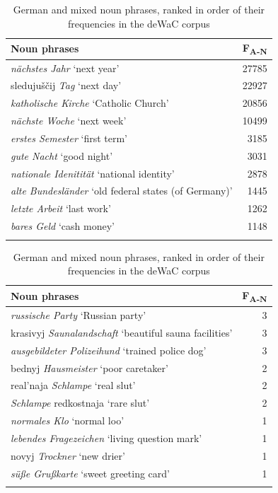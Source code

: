\begin{table}
		\begin{tabular}{lr}
		    \lsptoprule
			Noun phrases	& \multicolumn{1}{c}{F\textsubscript{A-N}} \\ \midrule
			\textit{nächstes Jahr} `next year'	&27785\\
			sledujuščij \textit{Tag} `next day'	&22927\\
			\textit{katholische Kirche} `Catholic Church'	&20856\\
			\textit{nächste Woche}	`next week'	&10499\\
			\textit{erstes Semester} `first term'	&3185\\
			\textit{gute Nacht} `good night'	&3031\\
			\textit{nationale Idenitität} `national identity'	&2878\\
			\textit{alte Bundesländer} `old federal states (of Germany)'	&1445\\
			\textit{letzte Arbeit} `last work'	&1262\\
			\textit{bares Geld} `cash money'	&1148\\
			\lspbottomrule 
		\end{tabular}
\caption{German and mixed noun phrases, ranked in order of their frequencies in the deWaC corpus\label{tab:4:7}} 
\end{table}

\begin{table}
		\begin{tabular}{lr}
		\lsptoprule
			Noun phrases	& \multicolumn{1}{c}{F\textsubscript{A-N}} \\\midrule
			\textit{russische Party} `Russian party'		&3\\
			krasivyj \textit{Saunalandschaft} `beautiful sauna facilities'	&3\\
			\textit{ausgebildeter Polizeihund} `trained police dog'	&3\\
			bednyj \textit{Hausmeister} `poor caretaker'		&2\\
			real'naja \textit{Schlampe} `real slut'	&2\\
			\textit{Schlampe} redkostnaja `rare slut'		&2\\
			\textit{normales Klo} `normal loo'	&1\\
			\textit{lebendes Fragezeichen} `living question mark'	&1\\
			novyj \textit{Trockner} `new drier'	&1\\
			\textit{süße Grußkarte} `sweet greeting card'	&1\\
			\lspbottomrule
		\end{tabular}
\caption{German and mixed noun phrases, ranked in order of their frequencies in the deWaC corpus\label{tab:4:8}} 
\end{table}

